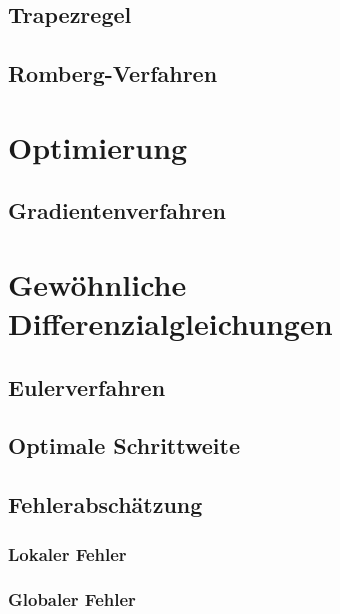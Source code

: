 \documentclass[a4paper, twoside]{article}
\begin{document}
\subsection{Trapezregel}


\subsection{Romberg-Verfahren}

\section{Optimierung}

\subsection{Gradientenverfahren}

\section{Gewöhnliche Differenzialgleichungen}

\subsection{Eulerverfahren}

\subsection{Optimale Schrittweite}

\subsection{Fehlerabschätzung}

\subsubsection{Lokaler Fehler}

\subsubsection{Globaler Fehler}
\end{document}

